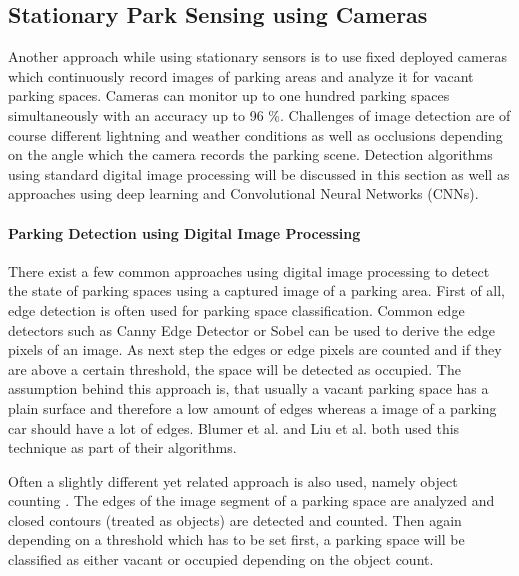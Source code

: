 




\subsection{Stationary Park Sensing using Cameras}
\label{sec:stationary_park_sensing_cameras}

Another approach while using stationary sensors is to use fixed deployed cameras which continuously record images of parking areas and analyze it for vacant parking spaces. Cameras can monitor up to one hundred parking spaces simultaneously with an accuracy up to 96 \%. Challenges of image detection are of course different lightning and weather conditions as well as occlusions depending on the angle which the camera records the parking scene. Detection algorithms using standard digital image processing will be discussed in this section as well as approaches using deep learning and Convolutional Neural Networks (CNNs).

\paragraph{Parking Detection using Digital Image Processing}

There exist a few common approaches using digital image processing to detect the state of parking spaces using a captured image of a parking area. First of all, edge detection is often used for parking space classification. Common edge detectors such as Canny Edge Detector or Sobel can be used to derive the edge pixels of an image. As next step the edges or edge pixels are counted and if they are above a certain threshold, the space will be detected as occupied. The assumption behind this approach is, that usually a vacant parking space has a plain surface and therefore a low amount of edges whereas a image of a parking car should have a lot of edges. Blumer et al. \cite{Blumer2012} and Liu et al. \cite{stationary_camera_sensing} both used this technique as part of their algorithms. 

Often a slightly different yet related approach is also used, namely object counting \cite{stationary_camera_sensing}. The edges of the image segment of a parking space are analyzed and closed contours (treated as objects) are detected and counted. Then again depending on a threshold which has to be set first, a parking space will be classified as either vacant or occupied depending on the object count.

